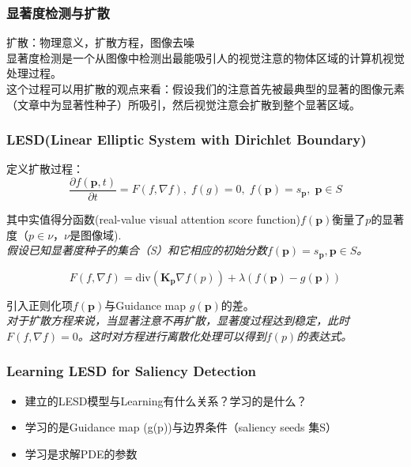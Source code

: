 \documentclass[notheorems,mathserif,table,compress]{beamer}  %
\begin{document}
%
\begin{frame}
\frametitle{显著度检测与扩散}
扩散：物理意义，扩散方程，图像去噪\\
显著度检测是一个从图像中检测出最能吸引人的视觉注意的物体区域的计算机视觉处理过程。\\
这个过程可以用扩散的观点来看：假设我们的注意首先被最典型的显著的图像元素（文章中为显著性种子）所吸引，然后视觉注意会扩散到整个显著区域。
\end{frame}


%
\begin{frame}
\frametitle{LESD(Linear Elliptic System with Dirichlet Boundary)}
定义扩散过程：
\begin{displaymath}
\frac{\partial f(\mathbf{p},t)}{\partial t}=F(f,\nabla f), \;f(g)=0,\;f(\mathbf{p})=s_\mathbf{p},\;\mathbf{p}\in S
\end{displaymath}

其中实值得分函数(real-value visual attention score function)$f(\mathbf{p})$衡量了$p$的显著度（$p\in \nu$，$\nu$是图像域).\\
\emph{假设已知显著度种子的集合（S）和它相应的初始分数$f(\mathbf{p})=s_\mathbf{p},\mathbf{p}\in S$。}

\begin{displaymath}
F(f,\nabla f)=\mathrm{div}(\mathbf{K_p}\nabla f(p))+\lambda(f(\mathbf{p})-g(\mathbf{p}))
\end{displaymath}

引入正则化项$f(\mathbf{p})$与Guidance map $g(\mathbf{p})$的差。\\
\emph{对于扩散方程来说，当显著注意不再扩散，显著度过程达到稳定，此时$F(f,\nabla f)=0$。这时对方程进行离散化处理可以得到$f(p)$的表达式。}
\end{frame}

%
\begin{frame}
\frametitle{Learning LESD for Saliency Detection}
\begin{itemize}
\item<1-> 建立的LESD模型与Learning有什么关系？学习的是什么？
\item<2-> 学习的是Guidance map (g(p))与边界条件（saliency seeds 集S）
\item<3->学习是求解PDE的参数
\end{itemize}

\end{frame}
\end{document}

